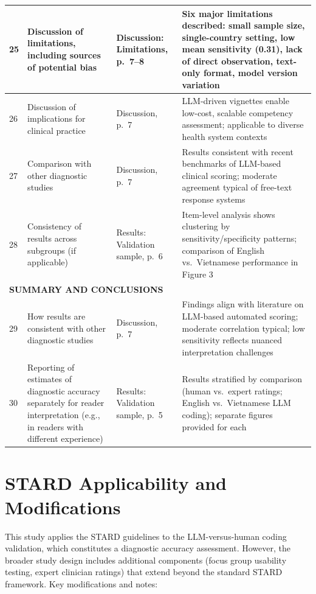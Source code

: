 \documentclass{article}
\begin{document}
\begin{table}[htbp]
\begin{tabularx}{\textwidth}{|p{0.8cm}|p{5.5cm}|p{6.5cm}|p{3cm}|}
25 & Discussion of limitations, including sources of potential bias & Discussion: Limitations, p.\ 7--8 & Six major limitations described: small sample size, single-country setting, low mean sensitivity (0.31), lack of direct observation, text-only format, model version variation \\
\hline

26 & Discussion of implications for clinical practice & Discussion, p.\ 7 & LLM-driven vignettes enable low-cost, scalable competency assessment; applicable to diverse health system contexts \\
\hline

27 & Comparison with other diagnostic studies & Discussion, p.\ 7 & Results consistent with recent benchmarks of LLM-based clinical scoring; moderate agreement typical of free-text response systems \\
\hline

28 & Consistency of results across subgroups (if applicable) & Results: Validation sample, p.\ 6 & Item-level analysis shows clustering by sensitivity/specificity patterns; comparison of English vs.\ Vietnamese performance in Figure 3 \\
\hline

\multicolumn{4}{l}{\textbf{SUMMARY AND CONCLUSIONS}} \\
\hline

29 & How results are consistent with other diagnostic studies & Discussion, p.\ 7 & Findings align with literature on LLM-based automated scoring; moderate correlation typical; low sensitivity reflects nuanced interpretation challenges \\
\hline

30 & Reporting of estimates of diagnostic accuracy separately for reader interpretation (e.g., in readers with different experience) & Results: Validation sample, p.\ 5 & Results stratified by comparison (human vs.\ expert ratings; English vs.\ Vietnamese LLM coding); separate figures provided for each \\
\hline

\end{tabularx}
\end{table}

\newpage

\section*{STARD Applicability and Modifications}

This study applies the STARD guidelines to the LLM-versus-human coding validation, which constitutes a diagnostic accuracy assessment. However, the broader study design includes additional components (focus group usability testing, expert clinician ratings) that extend beyond the standard STARD framework. Key modifications and notes:
\end{document}
